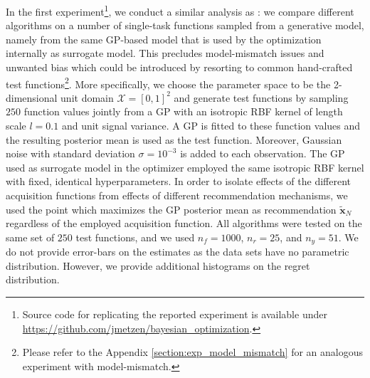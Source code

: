 \documentclass[10pt,letterpaper]{article} %
\begin{document}
In the first experiment\footnote{Source code for replicating the reported experiment
is available under \url{https://github.com/jmetzen/bayesian_optimization}.}, 
we conduct a similar analysis as \citet[Section
3.1]{hennig_entropy_2012}: we compare different algorithms on a number of
single-task functions sampled from a generative model, namely from the same GP-based model
that is used by the optimization internally as surrogate model. This precludes
model-mismatch issues and unwanted bias which could be introduced by resorting
to common hand-crafted test functions\footnote{Please refer to the Appendix \ref{section:exp_model_mismatch} for an analogous experiment with model-mismatch.}. More specifically, we choose the
parameter space to be the 2-dimensional unit domain $\mathcal{X} = [0, 1]^2$ and generate test
functions by sampling $250$ function values jointly from a GP with an isotropic RBF kernel
of length scale $l = 0.1$ and unit signal variance. A GP is
fitted to these function values and the resulting posterior mean is used as the
test function. Moreover, Gaussian noise with standard deviation $\sigma =
10^{-3}$ is added to each observation. The GP used as surrogate model in the optimizer employed the same 
isotropic RBF kernel with fixed, identical hyperparameters. 
In order to isolate effects of the different acquisition functions from effects of different
recommendation mechanisms, we used the point which maximizes the GP posterior
mean as recommendation $\mathbf{\tilde x}_N$ regardless of the employed acquisition function.
All algorithms were tested on the same
set of $250$ test functions, and we used $n_f=1000$, $n_r=25$, and $n_y=51$.
We do not provide error-bars on the estimates as the data sets have no parametric distribution. 
However, we provide additional histograms on the regret distribution.
\end{document}
